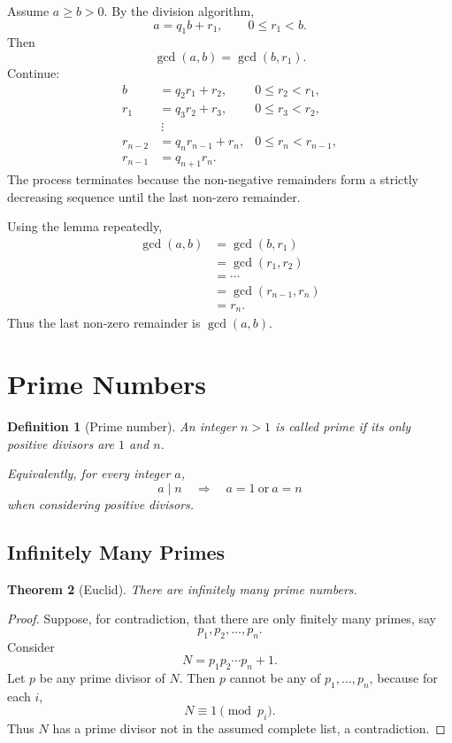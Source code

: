 \documentclass[11pt]{article}
\newtheorem{theorem}{Theorem}[section]
\newtheorem{definition}[theorem]{Definition}
\theoremstyle{remark}
\DeclareMathOperator{\gcdop}{gcd}
\begin{document}
Assume $a\ge b>0$. By the division algorithm,
\[
    a=q_1b+r_1,
    \qquad 0\le r_1<b.
\]
Then
\[
    \gcdop(a,b)=\gcdop(b,r_1).
\]
Continue:
\begin{align*}
    b &= q_2r_1+r_2,
        &0\le r_2<r_1,\\
    r_1 &= q_3r_2+r_3,
        &0\le r_3<r_2,\\
    &\ \vdots\\
    r_{n-2} &= q_nr_{n-1}+r_n,
        &0\le r_n<r_{n-1},\\
    r_{n-1} &= q_{n+1}r_n.
\end{align*}
The process terminates because the non-negative remainders form a strictly
decreasing sequence until the last non-zero remainder.

Using the lemma repeatedly,
\[
\begin{aligned}
    \gcdop(a,b)
    &=\gcdop(b,r_1)\\
    &=\gcdop(r_1,r_2)\\
    &=\cdots\\
    &=\gcdop(r_{n-1},r_n)\\
    &=r_n.
\end{aligned}
\]
Thus the last non-zero remainder is $\gcdop(a,b)$.

\section{Prime Numbers}

\begin{definition}[Prime number]
An integer $n>1$ is called \emph{prime} if its only positive divisors are
$1$ and $n$.

Equivalently, for every integer $a$,
\[
    a\mid n
    \quad\Longrightarrow\quad
    a=1\ \text{or}\ a=n
\]
when considering positive divisors.
\end{definition}

\subsection{Infinitely Many Primes}

\begin{theorem}[Euclid]
There are infinitely many prime numbers.
\end{theorem}

\begin{proof}
Suppose, for contradiction, that there are only finitely many primes,
say
\[
    p_1,p_2,\ldots,p_n.
\]
Consider
\[
    N=p_1p_2\cdots p_n+1.
\]
Let $p$ be any prime divisor of $N$. Then $p$ cannot be any of
$p_1,\ldots,p_n$, because for each $i$,
\[
    N\equiv1\pmod{p_i}.
\]
Thus $N$ has a prime divisor not in the assumed complete list, a
contradiction.
\end{proof}
\end{document}
